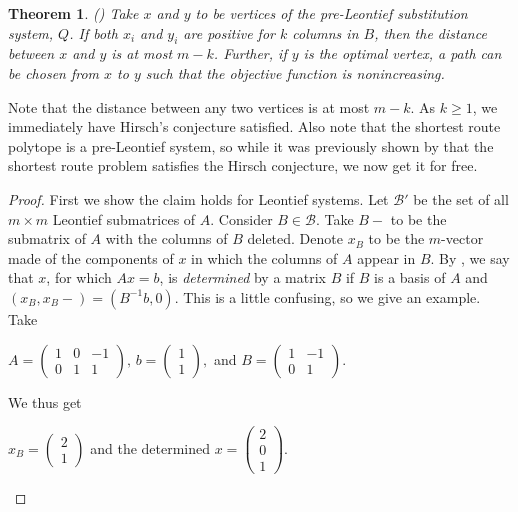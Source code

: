 \documentclass[11pt,a4paper]{article}
\newtheorem{thm}{Theorem}[section]
\theoremstyle{definition}
\begin{document}
\begin{thm}
{\rm(\citet{grin71})} Take $x$ and $y$ to be vertices of the pre-Leontief substitution system, $Q$. If both $x_i$ and $y_i$ are positive for $k$ columns in $B$, then the distance between $x$ and $y$ is at most $m-k$. Further, if $y$ is the optimal vertex, a path can be chosen from $x$ to $y$ such that the objective function is nonincreasing.
\end{thm}
Note that the distance between any two vertices is at most $m-k$. As $k\ge 1$, we immediately have Hirsch's conjecture satisfied. Also note that the shortest route polytope is a pre-Leontief system, so while it was previously shown by \citet{rom69} that the shortest route problem satisfies the Hirsch conjecture, we now get it for free.
\begin{proof}
First we show the claim holds for Leontief systems. Let $\mathcal{B}'$ be the set of all $m\times m$ Leontief submatrices of $A$. Consider $B\in \mathcal{B}$. Take $B-$ to be the submatrix of $A$ with the columns of $B$ deleted. Denote $x_B$ to be the $m$-vector made of the components of $x$ in which the columns of $A$ appear in $B$. By \citet{vein68}, we say that $x$, for which $Ax=b$, is \emph{determined} by a matrix $B$ if $B$ is a basis of $A$ and $(x_B,x_B-)=(B^{-1}b,0)$. This is a little confusing, so we give an example. Take	
\begin{center}
$A=
\left(
\begin{array}{ccc}
	1 & 0 & -1\\
	0 & 1 & 1
\end{array}
\right),\,
b=
\left(
\begin{array}{c}
	1 \\
	1
\end{array}
\right),$ and
$B=
\left(
\begin{array}{cc}
	1 & -1\\
	0 & 1
\end{array}
\right)$.
\end{center}
We thus get
\begin{center}
$x_B=
\left(
\begin{array}{c}
	2\\
	1
\end{array}
\right)$
and the determined
$x=
\left(
\begin{array}{c}
	2\\
	0\\
	1
\end{array}
\right)
$.
\end{center}


\end{proof}
\end{document}
